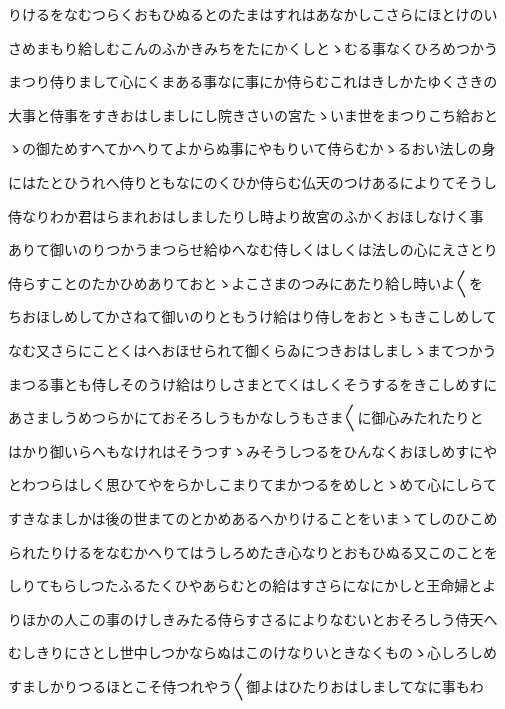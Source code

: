\documentclass[a4paper,11pt,landscape]{ltjtarticle}
\begin{document}
\par\medskip
りけるをなむつらくおもひぬるとのたまはすれはあなかしこさらにほとけのい
\par\medskip
さめまもり給しむこんのふかきみちをたにかくしとゝむる事なくひろめつかう
\par\medskip
まつり侍りまして心にくまある事なに事にか侍らむこれはきしかたゆくさきの
\par\medskip
大事と侍事をすきおはしましにし院きさいの宮たゝいま世をまつりこち給おと
\par\medskip
ゝの御ためすへてかへりてよからぬ事にやもりいて侍らむかゝるおい法しの身
\par\medskip
にはたとひうれへ侍りともなにのくひか侍らむ仏天のつけあるによりてそうし
\par\medskip
侍なりわか君はらまれおはしましたりし時より故宮のふかくおほしなけく事
\par\medskip
ありて御いのりつかうまつらせ給ゆへなむ侍しくはしくは法しの心にえさとり
\par\medskip
侍らすことのたかひめありておとゝよこさまのつみにあたり給し時いよ〱を
\par\medskip
ちおほしめしてかさねて御いのりともうけ給はり侍しをおとゝもきこしめして
\par\medskip
なむ又さらにことくはへおほせられて御くらゐにつきおはしましゝまてつかう
\par\medskip
まつる事とも侍しそのうけ給はりしさまとてくはしくそうするをきこしめすに
\par\medskip
あさましうめつらかにておそろしうもかなしうもさま〱に御心みたれたりと
\par\medskip
はかり御いらへもなけれはそうつすゝみそうしつるをひんなくおほしめすにや
\par\medskip
とわつらはしく思ひてやをらかしこまりてまかつるをめしとゝめて心にしらて
\par\medskip
すきなましかは後の世まてのとかめあるへかりけることをいまゝてしのひこめ
\par\medskip
られたりけるをなむかへりてはうしろめたき心なりとおもひぬる又このことを
\par\medskip
しりてもらしつたふるたくひやあらむとの給はすさらになにかしと王命婦とよ
\par\medskip
りほかの人この事のけしきみたる侍らすさるによりなむいとおそろしう侍天へ
\par\medskip
むしきりにさとし世中しつかならぬはこのけなりいときなくものゝ心しろしめ
\par\medskip
すましかりつるほとこそ侍つれやう〱御よはひたりおはしましてなに事もわ
\par\medskip
\end{document}
